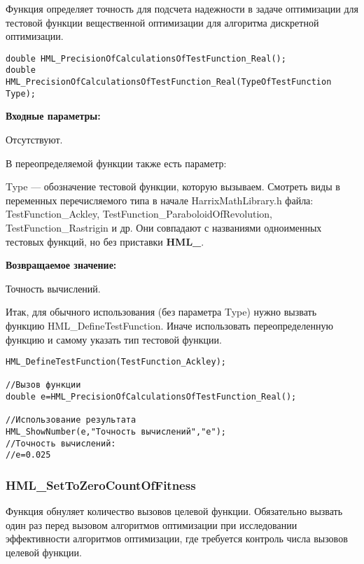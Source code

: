 \documentclass[a4paper,12pt]{article}
\begin{document}
Функция определяет точность для подсчета надежности в задаче оптимизации для тестовой функции вещественной оптимизации для алгоритма дискретной оптимизации.


\begin{lstlisting}[label=code_syntax_HML_PrecisionOfCalculationsOfTestFunction_Real,caption=Синтаксис]
double HML_PrecisionOfCalculationsOfTestFunction_Real();
double HML_PrecisionOfCalculationsOfTestFunction_Real(TypeOfTestFunction Type);
\end{lstlisting}

\textbf{Входные параметры:}

Отсутствуют.

В переопределяемой функции также есть параметр:
  
Type --- обозначение тестовой функции, которую вызываем.
Смотреть виды в переменных перечисляемого типа в начале HarrixMathLibrary.h файла: TestFunction\_Ackley, TestFunction\_ParaboloidOfRevolution, TestFunction\_Rastrigin и др. Они совпадают с названиями одноименных тестовых функций, но без приставки \textbf{HML\_}.

\textbf{Возвращаемое значение:}
 
Точность вычислений.

Итак, для обычного использования (без параметра Type) нужно вызвать функцию HML\_DefineTestFunction. Иначе использовать переопределенную функцию и самому указать тип тестовой функции.


\begin{lstlisting}[label=code_use_HML_PrecisionOfCalculationsOfTestFunction_Real,caption=Пример использования]
HML_DefineTestFunction(TestFunction_Ackley);

//Вызов функции
double e=HML_PrecisionOfCalculationsOfTestFunction_Real();

//Использование результата
HML_ShowNumber(e,"Точность вычислений","e");
//Точность вычислений:
//e=0.025
\end{lstlisting}

\subsubsection{HML\_SetToZeroCountOfFitness}\label{HML_SetToZeroCountOfFitness}

Функция обнуляет количество вызовов целевой функции. Обязательно вызвать один раз перед вызовом алгоритмов оптимизации при исследовании эффективности    алгоритмов оптимизации, где требуется контроль числа вызовов целевой функции.
\end{document}
